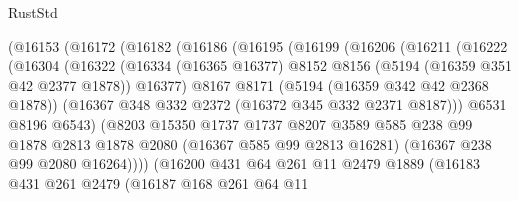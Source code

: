\begin{lexlean}{RustStd}
\begin{coremodule}
{\begin{coremodule}
{{{{{{{{{{{{{{{{{{{{{{{{{{{{{                    (@16153
                      (@16172
                        (@16182
                          (@16186
                            (@16195
                              (@16199
                                (@16206
                                  (@16211
                                    (@16222
                                      (@16304
                                        (@16322
                                          (@16334
                                            (@16365 @16377)
                                            @8152
                                            @8156
                                            (@5194 (@16359 @351 @42 @2377 @1878))
                                            @16377)
                                          @8167
                                          @8171
                                          (@5194 (@16359 @342 @42 @2368 @1878))
                                          (@16367 @348 @332 @2372 (@16372 @345 @332 @2371 @8187)))
                                        @6531
                                        @8196
                                        @6543)
                                      (@8203
                                        @15350
                                        @1737
                                        @1737
                                        @8207
                                        @3589
                                        @585
                                        @238
                                        @99
                                        @1878
                                        @2813
                                        @1878
                                        @2080
                                        (@16367 @585 @99 @2813 @16281)
                                        (@16367 @238 @99 @2080 @16264))))
                                  (@16200
                                    @431
                                    @64
                                    @261
                                    @11
                                    @2479
                                    @1889
                                    (@16183
                                      @431
                                      @261
                                      @2479
                                      (@16187
                                        @168
                                        @261
                                        @64
                                        @11
}}}}}}}}}}}}}}}}}}}}}}}}}}}}}
\end{coremodule}}
\end{coremodule}
\end{lexlean}

